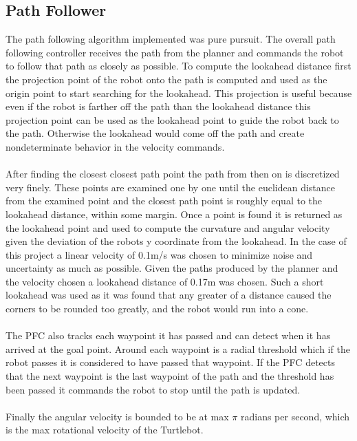 \documentclass[letterpaper,12pt]{article}
\begin{document}
\subsection{Path Follower}
The path following algorithm implemented was pure pursuit. The overall path following controller receives the path from the planner and commands the robot to follow that path as closely as possible. To compute the lookahead distance first the projection point of the robot onto the path is computed and used as the origin point to start searching for the lookahead. This projection is useful because even if the robot is farther off the path than the lookahead distance this projection point can be used as the lookahead point to guide the robot back to the path. Otherwise the lookahead would come off the path and create nondeterminate behavior in the velocity commands. 
\\\\
After finding the closest closest path point the path from then on is discretized very finely. These points are examined one by one until the euclidean distance from the examined point and the closest path point is roughly equal to the lookahead distance, within some margin. Once a point is found it is returned as the lookahead point and used to compute the curvature and angular velocity given the deviation of the robots y coordinate from the lookahead. In the case of this project a linear velocity of 0.1m/s was chosen to minimize noise and uncertainty as much as possible. Given the paths produced by the planner and the velocity chosen a lookahead distance of 0.17m was chosen. Such a short lookahead was used as it was found that any greater of a distance caused the corners to be rounded too greatly, and the robot would run into a cone.  
\\\\
The PFC also tracks each waypoint it has passed and can detect when it has arrived at the goal point. Around each waypoint is a radial threshold which if the robot passes it is considered to have passed that waypoint. If the PFC detects that the next waypoint is the last waypoint of the path and the threshold has been passed it commands the robot to stop until the path is updated. 
\\ \\
Finally the angular velocity is bounded to be at max $\pi$ radians per second, which is the max rotational velocity of the Turtlebot. 
\end{document}
